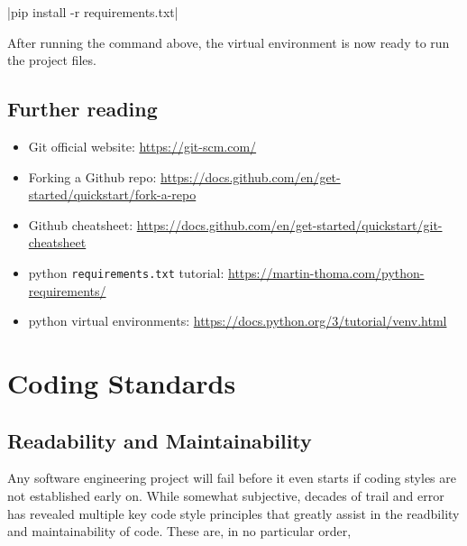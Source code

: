 \documentclass[11pt]{article}
\begin{document}
|pip install -r requirements.txt|

\noindent
After running the command above, the virtual environment is now ready to run the project files.

\subsection{Further reading}

\begin{itemize}
    \item Git official website: \url{https://git-scm.com/}
    \item Forking a Github repo: \url{https://docs.github.com/en/get-started/quickstart/fork-a-repo}
    \item Github cheatsheet: \url{https://docs.github.com/en/get-started/quickstart/git-cheatsheet}
    \item \Gls{python} \texttt{requirements.txt} tutorial: \url{https://martin-thoma.com/python-requirements/}
    \item \Gls{python} virtual environments: \url{https://docs.python.org/3/tutorial/venv.html}
\end{itemize}

\newpage

\section{Coding Standards}

\subsection{Readability and Maintainability}

Any software engineering project will fail before it even starts if coding styles are not established early on. While somewhat subjective, decades of trail and error has revealed multiple key code style principles that greatly assist in the readbility and maintainability of code. These are, in no particular order,
\end{document}
